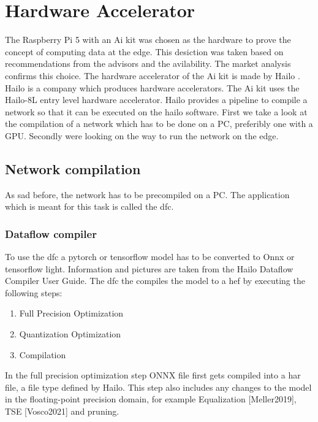 \chapter{Hardware Accelerator}

The Raspberry Pi 5 with an Ai kit was chosen as the hardware to prove the concept of computing data at the edge.
This desiction was taken based on recommendations from the advisors and the avilability.
The market analysis confirms this choice.
The hardware accelerator of the Ai kit is made by Hailo \cite{hailo}.
Hailo is a company which produces hardware accelerators.
The Ai kit uses the Hailo-8L entry level hardware accelerator.
Hailo provides a pipeline to compile a network so that it can be executed on the hailo software.
First we take a look at the compilation of a network which has to be done on a PC, 
preferibly one with a GPU.
Secondly were looking on the way to run the network on the edge.

\section{Network compilation}
As sad before, the network has to be precompiled on a PC.
The application which is meant for this task is called the \Acrfull{dfc}.

\subsection{Dataflow compiler
\label{section:dfc}}

To use the \acrshort{dfc} a pytorch or tensorflow model has to be converted to Onnx or tensorflow light.
Information and pictures are taken from the Hailo Dataflow Compiler User Guide\cite{hailo_dataflow_compiler}.
The \acrshort{dfc} the compiles the model to a \Acrfull{hef} by executing the following steps:

\begin{enumerate}
    \item Full Precision Optimization
    \item Quantization Optimization
    \item Compilation
\end{enumerate}
In the full precision optimization step ONNX file first gets compiled into a \acrfull{har} file, a file type defined by Hailo.
This step also includes any changes to the model in the floating-point precision domain, for example Equalization [Meller2019], TSE [Vosco2021] and pruning.

